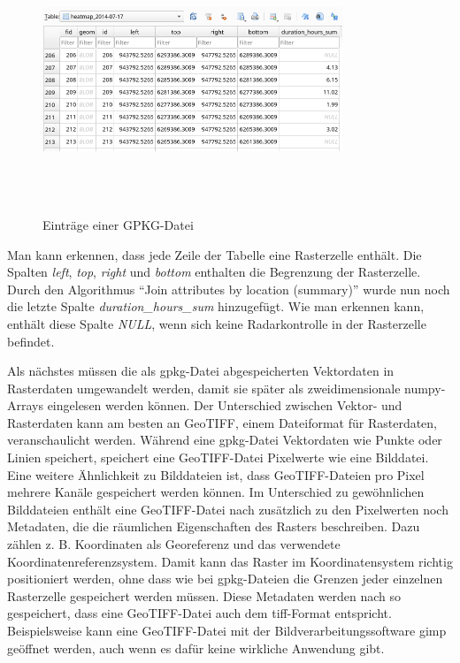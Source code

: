 \begin{figure}[h]
    \centering
    \includegraphics[width=0.8\textwidth,height=8cm,keepaspectratio=true]{content/images/GpkgExample.png}
    \caption{Einträge einer GPKG-Datei}
    \label{fig:GpkgExample}
\end{figure}

Man kann erkennen, dass jede Zeile der Tabelle eine Rasterzelle enthält.
Die Spalten \emph{left}, \emph{top}, \emph{right} und \emph{bottom} enthalten die Begrenzung der Rasterzelle.
Durch den Algorithmus "`Join attributes by location (summary)"' wurde nun noch die letzte Spalte \emph{duration\_hours\_sum} hinzugefügt.
Wie man erkennen kann, enthält diese Spalte \emph{NULL}, wenn sich keine Radarkontrolle in der Rasterzelle befindet.

Als nächstes müssen die als \acrshort{gpkg}-Datei abgespeicherten Vektordaten in Rasterdaten umgewandelt werden, damit sie später als zweidimensionale numpy-Arrays eingelesen werden können.
Der Unterschied zwischen Vektor- und Rasterdaten kann am besten an GeoTIFF, einem Dateiformat für Rasterdaten, veranschaulicht werden.
Während eine \acrshort{gpkg}-Datei Vektordaten wie Punkte oder Linien speichert, speichert eine GeoTIFF-Datei Pixelwerte wie eine Bilddatei.
Eine weitere Ähnlichkeit zu Bilddateien ist, dass GeoTIFF-Dateien pro Pixel mehrere Kanäle gespeichert werden können.
Im Unterschied zu gewöhnlichen Bilddateien enthält eine GeoTIFF-Datei nach \cite[S. 128]{PracticalGIS} zusätzlich zu den Pixelwerten noch Metadaten, die die räumlichen Eigenschaften des Rasters beschreiben.
Dazu zählen z. B. Koordinaten als Georeferenz und das verwendete Koordinatenreferenzsystem.
Damit kann das Raster im Koordinatensystem richtig positioniert werden, ohne dass wie bei \acrshort{gpkg}-Dateien die Grenzen jeder einzelnen Rasterzelle gespeichert werden müssen.
Diese Metadaten werden nach \cite{GeoTIFFStandard} so gespeichert, dass eine GeoTIFF-Datei auch dem \acrshort{tiff}-Format entspricht.
Beispielsweise kann eine GeoTIFF-Datei mit der Bildverarbeitungssoftware \acrfull{gimp} geöffnet werden, auch wenn es dafür keine wirkliche Anwendung gibt.

